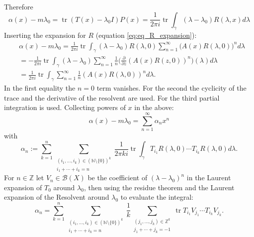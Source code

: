 \documentclass[11pt]{article}
\DeclareMathOperator{\tr}{tr}
\begin{document}
Therefore
\begin{equation}
    \alpha (x) -  m \lambda_0 = \tr (T(x) - \lambda_0 I ) P(x)
    = \frac{1}{2\pi i} \tr \int_\gamma (\lambda - \lambda_0 ) R(\lambda, x) d\lambda
\end{equation}
Inserting the expansion for $R$ (equation \ref{eq:eq_R_expansion}): 
\begin{equation}
    \begin{split}
        &\alpha (x) -  m \lambda_0 
        = \frac{1}{2\pi i} \tr \int_\gamma (\lambda - \lambda_0 )  R(\lambda,0)  \sum_{n=1}^\infty  (A(x) R(\lambda,0) \big)^n d\lambda \\
        &= -\frac{1}{2\pi i} \tr \int_\gamma (\lambda - \lambda_0) \sum_{n=1}^\infty \frac{1}{n}
        \bigg(\frac{\partial }{ \partial z}  (A(x) R(z,0))^n \bigg) (\lambda) d \lambda  \\
        &= \frac{1}{2\pi i} \tr \int_\gamma  \sum_{n=1}^\infty \frac{1}{n}
         (A(x) R(\lambda,0))^n  d \lambda.
    \end{split}
\end{equation}
In the first equality the $n=0$ term vanishes.
For the second the cyclicity of the trace and the derivative of the resolvent are used.
For the third partial integration is used.
Collecting powers of $x$ in the above:
\begin{equation}
    \alpha (x) - m \lambda_0 = \sum_{n=1}^\infty \alpha_n x^n
\end{equation}
with
\begin{equation}
    \alpha_n := \sum_{k=1}^n  \sum_{ \substack{(i_1, \dots, i_k) \in (\mathbb{N} \setminus \{0\})^k \\ i_1 + \cdots + i_k = n}}
    \frac{1}{2 \pi k i} \tr \int_\gamma T_{i_1} R(\lambda, 0)  \cdots  T_{i_k} R(\lambda, 0) d \lambda .
\end{equation}
For $n \in \mathbb{Z}$ let $V_n \in \mathscr{B}(X)$ be the coefficient of $(\lambda-\lambda_0)^{n}$ in the Laurent expansion of $T_0$
around $\lambda_0$, then
using the residue theorem and the Laurent expansion of the Resolvent around $\lambda_0$ to evaluate the integral:
\begin{equation}
    \alpha_n =\sum_{k=1}^n 
    \sum_{ \substack{(i_1, \dots, i_k) \in (\mathbb{N} \setminus \{0\})^k \\ i_1 + \cdots + i_k = n}}
    \frac{1}{k} \sum_{\substack{(j_1, \dots, j_k) \in \mathbb{Z}^k\\ j_1 + \cdots + j_k = -1 }}
    \tr T_{i_1} V_{j_1} \cdots T_{i_k} V_{j_k}.
\end{equation}
\end{document}
